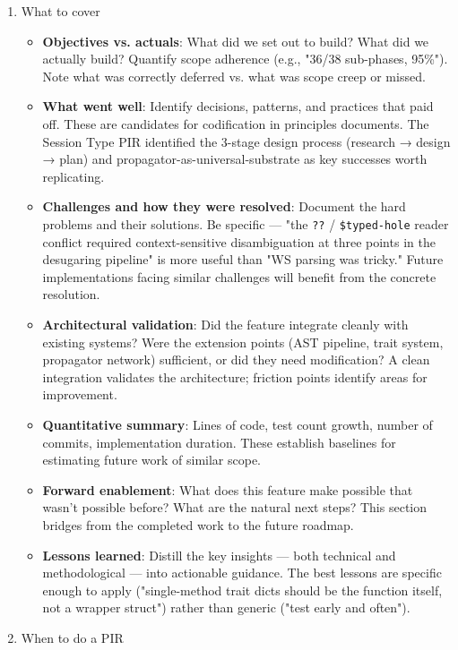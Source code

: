 \documentclass[11pt]{article}
\begin{document}
\begin{enumerate}
\item What to cover
\label{sec:orgc0cd1e1}

\begin{itemize}
\item \textbf{Objectives vs. actuals}: What did we set out to build? What did we
actually build? Quantify scope adherence (e.g., "36/38 sub-phases,
95\%"). Note what was correctly deferred vs. what was scope creep or
missed.

\item \textbf{What went well}: Identify decisions, patterns, and practices that
paid off. These are candidates for codification in principles
documents. The Session Type PIR identified the 3-stage design process
(research → design → plan) and propagator-as-universal-substrate as
key successes worth replicating.

\item \textbf{Challenges and how they were resolved}: Document the hard problems
and their solutions. Be specific --- "the \texttt{??} / \texttt{\$typed-hole} reader
conflict required context-sensitive disambiguation at three points in
the desugaring pipeline" is more useful than "WS parsing was tricky."
Future implementations facing similar challenges will benefit from
the concrete resolution.

\item \textbf{Architectural validation}: Did the feature integrate cleanly with
existing systems? Were the extension points (AST pipeline, trait
system, propagator network) sufficient, or did they need modification?
A clean integration validates the architecture; friction points
identify areas for improvement.

\item \textbf{Quantitative summary}: Lines of code, test count growth, number of
commits, implementation duration. These establish baselines for
estimating future work of similar scope.

\item \textbf{Forward enablement}: What does this feature make possible that wasn't
possible before? What are the natural next steps? This section bridges
from the completed work to the future roadmap.

\item \textbf{Lessons learned}: Distill the key insights --- both technical and
methodological --- into actionable guidance. The best lessons are
specific enough to apply ("single-method trait dicts should be the
function itself, not a wrapper struct") rather than generic ("test
early and often").
\end{itemize}
\item When to do a PIR
\label{sec:org97782ff}


\end{enumerate}
\end{document}

